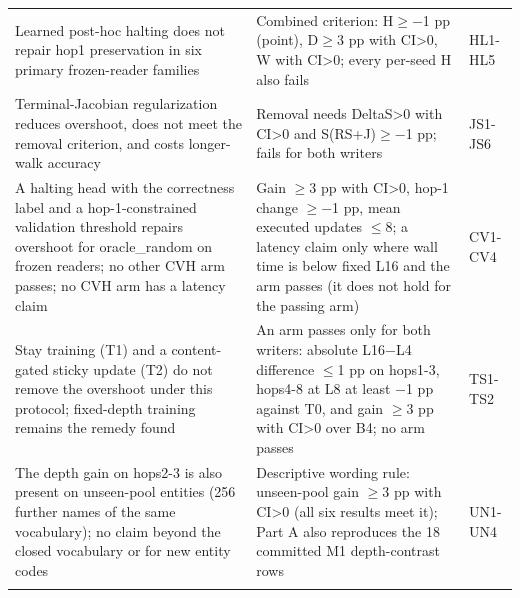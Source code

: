 {\begin{longtable}{W{469}{6}W{469}{6}W{63}{6}}
Learned post-hoc halting does not repair hop1 preservation in six primary frozen-reader families & Combined criterion: H\ensuremath{\geq}\ensuremath{-}1 pp (point), D\ensuremath{\geq}3 pp with CI>0, W with CI>0; every per-seed H also fails & HL1-HL5 \\ \addlinespace[3pt]  %
Terminal-Jacobian regularization reduces overshoot, does not meet the removal criterion, and costs longer-walk accuracy & Removal needs DeltaS>0 with CI>0 and S(RS+J)\ensuremath{\geq}\ensuremath{-}1 pp; fails for both writers & JS1-JS6 \\ \addlinespace[3pt]  %
A halting head with the correctness label and a hop-1-constrained validation threshold repairs overshoot for oracle\_random on frozen readers; no other CVH arm passes; no CVH arm has a latency claim & Gain \ensuremath{\geq}3 pp with CI>0, hop-1 change \ensuremath{\geq}\ensuremath{-}1 pp, mean executed updates \ensuremath{\leq}8; a latency claim only where wall time is below fixed L16 and the arm passes (it does not hold for the passing arm) & CV1-CV4 \\ \addlinespace[3pt]  %
Stay training (T1) and a content-gated sticky update (T2) do not remove the overshoot under this protocol; fixed-depth training remains the remedy found & An arm passes only for both writers: absolute L16\ensuremath{-}L4 difference \ensuremath{\leq}1 pp on hops1-3, hops4-8 at L8 at least \ensuremath{-}1 pp against T0, and gain \ensuremath{\geq}3 pp with CI>0 over B4; no arm passes & TS1-TS2 \\ \addlinespace[3pt]  %
The depth gain on hops2-3 is also present on unseen-pool entities (256 further names of the same vocabulary); no claim beyond the closed vocabulary or for new entity codes & Descriptive wording rule: unseen-pool gain \ensuremath{\geq}3 pp with CI>0 (all six results meet it); Part A also reproduces the 18 committed M1 depth-contrast rows & UN1-UN4 \\ \addlinespace[3pt]  %
\bottomrule
\end{longtable}
}

